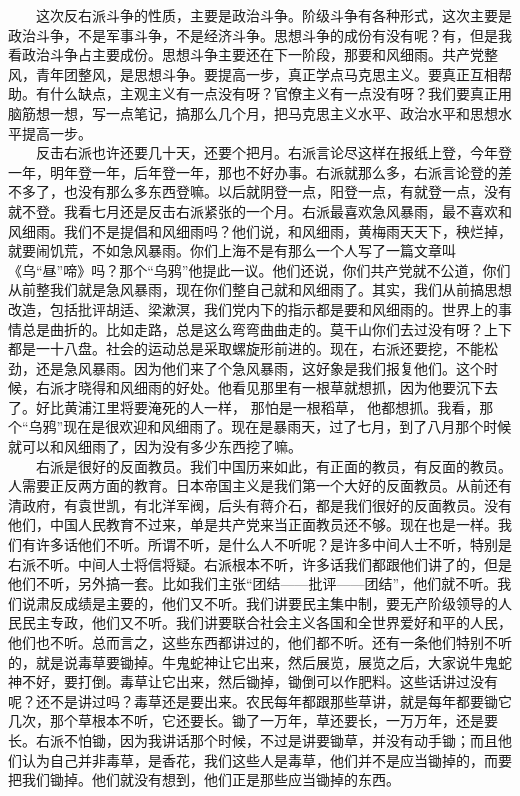 \documentclass[cn,11pt,chinese]{elegantbook}
\begin{document}
　　这次反右派斗争的性质，主要是政治斗争。阶级斗争有各种形式，这次主要是政治斗争，不是军事斗争，不是经济斗争。思想斗争的成份有没有呢？有，但是我看政治斗争占主要成份。思想斗争主要还在下一阶段，那要和风细雨。共产党整风，青年团整风，是思想斗争。要提高一步，真正学点马克思主义。要真正互相帮助。有什么缺点，主观主义有一点没有呀？官僚主义有一点没有呀？我们要真正用脑筋想一想，写一点笔记，搞那么几个月，把马克思主义水平、政治水平和思想水平提高一步。\\
　　反击右派也许还要几十天，还要个把月。右派言论尽这样在报纸上登，今年登一年，明年登一年，后年登一年，那也不好办事。右派就那么多，右派言论登的差不多了，也没有那么多东西登嘛。以后就阴登一点，阳登一点，有就登一点，没有就不登。我看七月还是反击右派紧张的一个月。右派最喜欢急风暴雨，最不喜欢和风细雨。我们不是提倡和风细雨吗？他们说，和风细雨，黄梅雨天天下，秧烂掉，就要闹饥荒，不如急风暴雨。你们上海不是有那么一个人写了一篇文章叫《乌“昼”啼》吗？那个“乌鸦”他提此一议。他们还说，你们共产党就不公道，你们从前整我们就是急风暴雨，现在你们整自己就和风细雨了。其实，我们从前搞思想改造，包括批评胡适、梁漱溟，我们党内下的指示都是要和风细雨的。世界上的事情总是曲折的。比如走路，总是这么弯弯曲曲走的。莫干山你们去过没有呀？上下都是一十八盘。社会的运动总是采取螺旋形前进的。现在，右派还要挖，不能松劲，还是急风暴雨。因为他们来了个急风暴雨，这好象是我们报复他们。这个时候，右派才晓得和风细雨的好处。他看见那里有一根草就想抓，因为他要沉下去了。好比黄浦江里将要淹死的人一样， 那怕是一根稻草， 他都想抓。我看，那个“乌鸦”现在是很欢迎和风细雨了。现在是暴雨天，过了七月，到了八月那个时候就可以和风细雨了，因为没有多少东西挖了嘛。\\
　　右派是很好的反面教员。我们中国历来如此，有正面的教员，有反面的教员。人需要正反两方面的教育。日本帝国主义是我们第一个大好的反面教员。从前还有清政府，有袁世凯，有北洋军阀，后头有蒋介石，都是我们很好的反面教员。没有他们，中国人民教育不过来，单是共产党来当正面教员还不够。现在也是一样。我们有许多话他们不听。所谓不听，是什么人不听呢？是许多中间人士不听，特别是右派不听。中间人士将信将疑。右派根本不听，许多话我们都跟他们讲了的，但是他们不听，另外搞一套。比如我们主张“团结——批评——团结”，他们就不听。我们说肃反成绩是主要的，他们又不听。我们讲要民主集中制，要无产阶级领导的人民民主专政，他们又不听。我们讲要联合社会主义各国和全世界爱好和平的人民，他们也不听。总而言之，这些东西都讲过的，他们都不听。还有一条他们特别不听的，就是说毒草要锄掉。牛鬼蛇神让它出来，然后展览，展览之后，大家说牛鬼蛇神不好，要打倒。毒草让它出来，然后锄掉，锄倒可以作肥料。这些话讲过没有呢？还不是讲过吗？毒草还是要出来。农民每年都跟那些草讲，就是每年都要锄它几次，那个草根本不听，它还要长。锄了一万年，草还要长，一万万年，还是要长。右派不怕锄，因为我讲话那个时候，不过是讲要锄草，并没有动手锄；而且他们认为自己并非毒草，是香花，我们这些人是毒草，他们并不是应当锄掉的，而要把我们锄掉。他们就没有想到，他们正是那些应当锄掉的东西。\\
\end{document}
